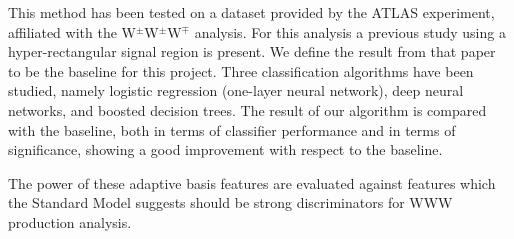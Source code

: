 \documentclass{article}
\begin{document}
This method has been tested on a dataset provided by the ATLAS experiment, affiliated with the W$^{\pm}$W$^{\pm}$W$^{\mp}$ analysis. For this analysis a previous study using a hyper-rectangular signal region is present. We define the result from that paper to be the baseline for this project. Three classification algorithms have been studied, namely logistic regression (one-layer neural network), deep neural networks, and boosted decision trees. The result of our algorithm is compared with the baseline, both in terms of classifier performance and in terms of significance, showing a good improvement with respect to the baseline. 

The power of these adaptive basis features are evaluated against features which the Standard Model suggests should be strong discriminators for WWW production analysis. 

\end{document}
